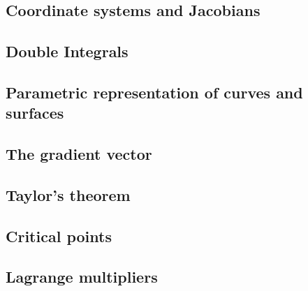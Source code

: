 \subsection{Coordinate systems and Jacobians}
\subsection{Double Integrals}
\subsection{Parametric representation of curves and surfaces}
\subsection{The gradient vector}
\subsection{Taylor's theorem}
\subsection{Critical points}
\subsection{Lagrange multipliers}